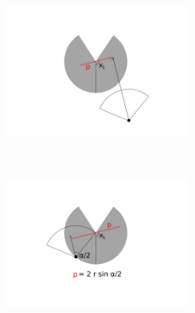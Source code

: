 \documentclass[a4paper,10pt,reqno,oneside]{amsart}
\begin{document}
\begin{figure}[t]
\captionsetup{width=14cm}
        \centering
	\begin{subfigure}[t]{60mm}
                \centering
		\includegraphics[width=60mm, trim= 6cm 2cm 6cm 0.3cm]{imgs/x1.pdf}
                \caption{}
                \label{f:xOne}
        \end{subfigure}%
	~ 
	\begin{subfigure}[t]{60mm}
                \centering
		\includegraphics[width=60mm, trim= 6cm 2cm 6cm 4cm]{imgs/firstIntegral.pdf}
                \caption{}
                \label{f:firstInt}
        \end{subfigure}%
	 

\end{figure}
\end{document}
